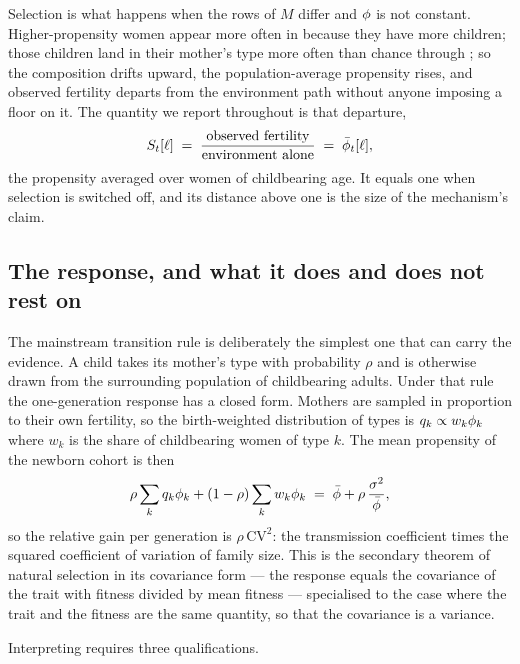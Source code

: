Selection is what happens when the rows of $M$ differ and $\phi$ is not
constant. Higher-propensity women appear more often in
 because they have more children; those children land
in their mother's type more often than chance through
; so the composition drifts upward, the
population-average propensity rises, and observed fertility departs from the
environment path without anyone imposing a floor on it. The quantity we report
throughout is that departure,
\begin{equation}
  S_t[\ell] \;=\; \frac{\text{observed fertility}}{\text{environment alone}}
            \;=\; \bar{\phi}_t[\ell],
  \label{eq:selection-effect}
\end{equation}
the propensity averaged over women of childbearing age. It equals one when
selection is switched off, and its distance above one is the size of the
mechanism's claim.

\subsection{The response, and what it does and does not rest on}
\label{sec:response}

The mainstream transition rule is deliberately the simplest one that can carry
the evidence. A child takes its mother's type with probability $\rho$ and is
otherwise drawn from the surrounding population of childbearing adults. Under
that rule the one-generation response has a closed form. Mothers are sampled in
proportion to their own fertility, so the birth-weighted distribution of types is
$q_k \propto w_k \phi_k$ where $w_k$ is the share of childbearing women of
type $k$. The mean propensity of the newborn cohort is then
\begin{equation}
  \rho \sum_k q_k \phi_k + (1-\rho) \sum_k w_k \phi_k
  \;=\; \bar{\phi} + \rho\,\frac{\sigma^2}{\bar{\phi}},
  \label{eq:response}
\end{equation}
so the relative gain per generation is $\rho\,\mathrm{CV}^2$: the transmission
coefficient times the squared coefficient of variation of family size. This is
the secondary theorem of natural selection in its covariance form
\citep{robertson1966,price1970} --- the response equals the covariance of the
trait with fitness divided by mean fitness --- specialised to the case where the
trait and the fitness are the same quantity, so that the covariance is a
variance.

Interpreting  requires three qualifications.

